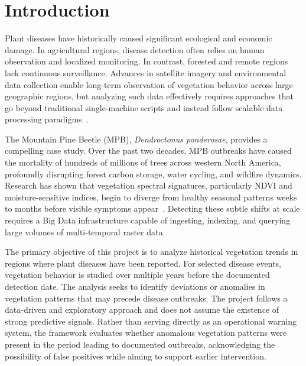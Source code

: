 \section{Introduction}

Plant diseases have historically caused significant ecological and economic damage. In agricultural regions, disease detection often relies on human observation and localized monitoring. In contrast, forested and remote regions lack continuous surveillance. Advances in satellite imagery and environmental data collection enable long-term observation of vegetation behavior across large geographic regions, but analyzing such data effectively requires approaches that go beyond traditional single-machine scripts and instead follow scalable data processing paradigms~\cite{verbesselt2010, xie2025}.

The Mountain Pine Beetle (MPB), \textit{Dendroctonus ponderosae}, provides a compelling case study. Over the past two decades, MPB outbreaks have caused the mortality of hundreds of millions of trees across western North America, profoundly disrupting forest carbon storage, water cycling, and wildfire dynamics. Research has shown that vegetation spectral signatures, particularly NDVI and moisture-sensitive indices, begin to diverge from healthy seasonal patterns weeks to months before visible symptoms appear~\cite{jamali2024, lasaponara2024}. Detecting these subtle shifts at scale requires a Big Data infrastructure capable of ingesting, indexing, and querying large volumes of multi-temporal raster data.

The primary objective of this project is to analyze historical vegetation trends in regions where plant diseases have been reported. For selected disease events, vegetation behavior is studied over multiple years before the documented detection date. The analysis seeks to identify deviations or anomalies in vegetation patterns that may precede disease outbreaks. The project follows a data-driven and exploratory approach and does not assume the existence of strong predictive signals. Rather than serving directly as an operational warning system, the framework evaluates whether anomalous vegetation patterns were present in the period leading to documented outbreaks, acknowledging the possibility of false positives while aiming to support earlier intervention.

